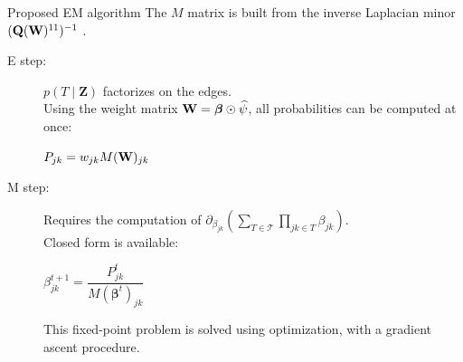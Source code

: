 \documentclass[11pt]{beamer}
\newcommand\betab{{\boldsymbol{\beta}}}
\newcommand\Qb{{\bf Q}}
\newcommand\Wb{{\bf W}}
\newcommand{\Zbf}{{\boldsymbol{Z}}}
\newcommand{\emphase}[1]{\textcolor{Complement}{#1}}
\begin{document}
  
  \begin{frame}{Proposed EM algorithm}
The $M$ matrix is built from the inverse Laplacian minor $(\Qb(\Wb)^{11})^{-1}$ \citep{MeilaJaak}.\vspace{0.5cm}
   
  \begin{description}
  \item[E step:]$p(T\mid\Zbf)$ factorizes on the edges. \\
  Using the weight matrix \emphase{$\Wb = \betab \odot \widehat{\psi}$}, all probabilities can be computed at once:
  \begin{center}
  $P_{jk} = w_{jk} M(\Wb)_{jk}$  \citep{kirshner}  
  \end{center}\vspace{0.5cm}
  \item[M step:] Requires the computation of $\partial_{\beta_{jk}} (\sum_{T\in\mathcal{T}}\prod_{jk\in T} \beta_{jk})$.\\
  Closed form is available:
  \begin{center}
  \emphase{  \large{$\beta_{jk}^{t+1} = \dfrac{P_{jk}^t}{M(\betab^t)_{jk}}$}}
  \end{center}
  This fixed-point problem is solved using optimization, with a gradient ascent procedure.
   \end{description}

  \end{frame}
 
\end{document}
